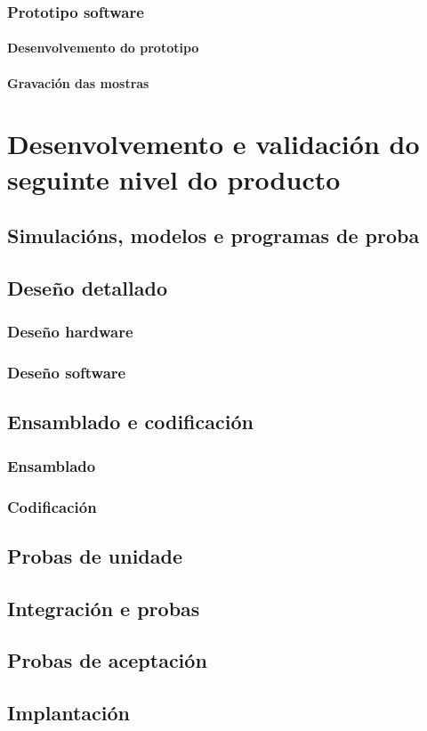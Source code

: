   \subsubsection{Prototipo software}

   \paragraph{Desenvolvemento do prototipo}

   \paragraph{Gravación das mostras}

\section{Desenvolvemento e validación do seguinte nivel do producto}

 \subsection{Simulacións, modelos e programas de proba}

 \subsection{Deseño detallado}

  \subsubsection{Deseño hardware}

  \subsubsection{Deseño software}

 \subsection{Ensamblado e codificación}

  \subsubsection{Ensamblado}

  \subsubsection{Codificación}

 \subsection{Probas de unidade}

 \subsection{Integración e probas}

 \subsection{Probas de aceptación}

 \subsection{Implantación}